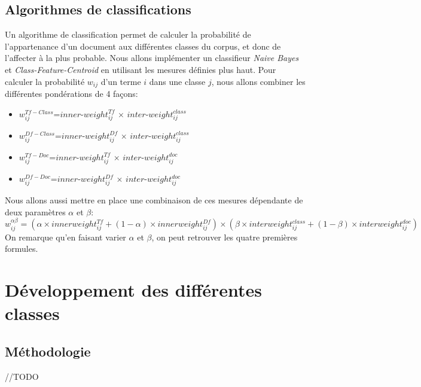 \documentclass{article}
\begin{document}
\subsection{Algorithmes de classifications}
Un algorithme de classification permet de calculer la probabilité de l'appartenance d'un document aux différentes classes du corpus, et donc de l'affecter à la plus probable. Nous allons implémenter un classifieur \textit{Naive Bayes} et \textit{Class-Feature-Centroid}\cite{RNTIB} en utilisant les mesures définies plus haut. Pour calculer la probabilité $w_{ij}$ d'un terme $i$ dans une classe $j$, nous allons combiner les différentes pondérations de 4 façons:
\begin{itemize}
\item $w_{ij}^{Tf-Class}$=$inner$-$weight_{ij}^{Tf}$ $\times$ $inter$-$weight_{ij}^{class}$
\item $w_{ij}^{Df-Class}$=$inner$-$weight_{ij}^{Df}$ $\times$ $inter$-$weight_{ij}^{class}$
\item $w_{ij}^{Tf-Doc}$=$inner$-$weight_{ij}^{Tf}$ $\times$ $inter$-$weight_{ij}^{doc}$
\item $w_{ij}^{Df-Doc}$=$inner$-$weight_{ij}^{Df}$ $\times$ $inter$-$weight_{ij}^{doc}$
\end{itemize}
Nous allons aussi mettre en place une combinaison de ces mesures dépendante de deux paramètres $\alpha$ et $\beta$:
\[ w_{ij}^{ \alpha \beta}=(\alpha \times innerweight_{ij}^{Tf} + (1-\alpha)\times innerweight_{ij}^{Df} )\times(\beta \times interweight_{ij}^{class} + (1-\beta) \times interweight_{ij}^{doc} )\]
On remarque qu'en faisant varier $\alpha$ et $\beta$, on peut retrouver les quatre premières formules.



\section{Développement des différentes classes}\label{sec:classes}

\subsection{Méthodologie}
//TODO
\end{document}
